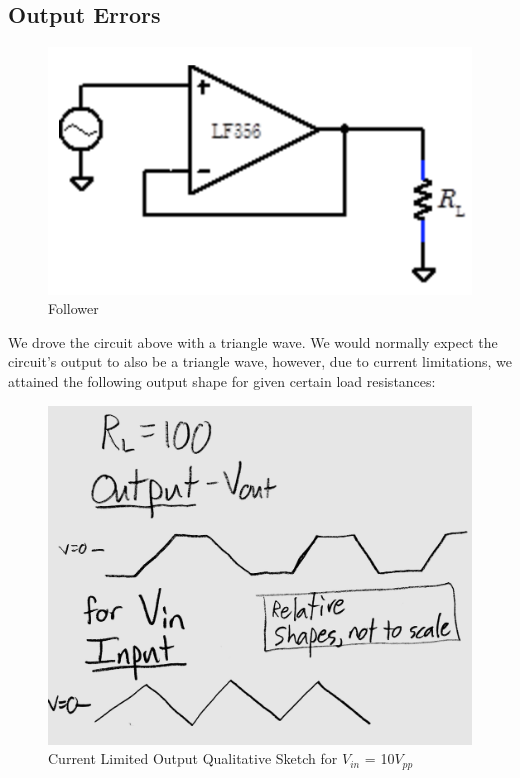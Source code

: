 \documentclass{article}
\begin{document}
\subsection{Output Errors}
    \begin{figure}[H]
        \centering
        \includegraphics[scale = 0.5]{6.png}
        \caption{Follower \cite{lab8}}
        \label{fig:my_label}
    \end{figure}
    We drove the circuit above with a triangle wave. We would normally expect the circuit's output to also be a triangle wave, however, due to current limitations, we attained the following output shape for given certain load resistances:
    \begin{figure}[H]
        \centering
        \includegraphics[scale = 0.1]{6a.JPG}
        \caption{Current Limited Output Qualitative Sketch for $V_{in}$ = 10$V_{pp}$}
        \label{fig:my_label}
    \end{figure}
\end{document}
